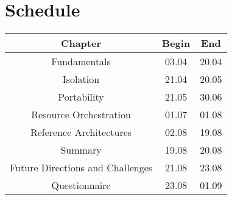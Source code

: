 \documentclass[english]{lni}
\begin{document}
\section{Schedule}
\begin{center}
\begin{tabular}{|c|c|c|} \hline 
\textbf{Chapter} & \textbf{Begin} & \textbf{End} \\ \hline
Fundamentals & 03.04 & 20.04 \\ \hline 
Isolation & 21.04 & 20.05 \\  \hline 
Portability & 21.05 & 30.06 \\ \hline 
Resource Orchestration & 01.07 & 01.08 \\ \hline 
Reference Architectures & 02.08 & 19.08 \\ \hline 
Summary & 19.08 & 20.08 \\ \hline 
Future Directions and Challenges & 21.08 & 23.08 \\ \hline
Questionnaire & 23.08 & 01.09 \\ \hline 
\end{tabular}
\end{center}

\clearpage 
\printbibliography
\end{document}
